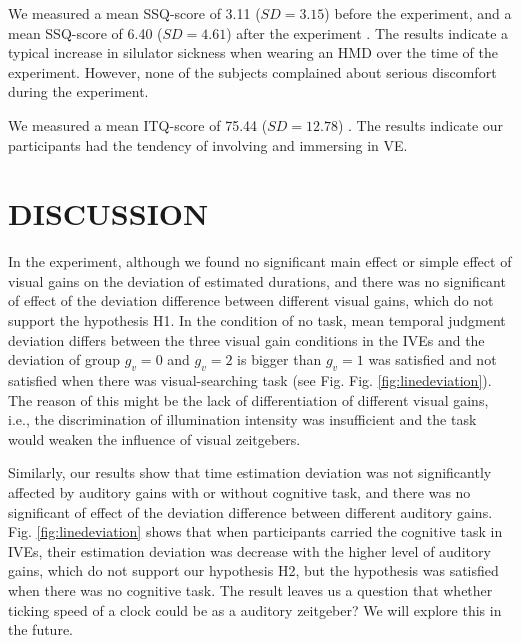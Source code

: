 \documentclass[sigconf]{acmart}
\begin{document}
We measured a mean SSQ-score of 3.11 ($SD = 3.15$) before the experiment, and a mean SSQ-score of 6.40 ($SD = 4.61$) after the experiment \cite{kennedy1993simulator}. The results indicate a typical increase in silulator sickness when wearing an HMD over the time of the experiment. However, none of the subjects complained about serious discomfort during the experiment.

We measured a mean ITQ-score of 75.44 ($SD = 12.78$) \cite{witmer1998measuring}. The results indicate our participants had the tendency of involving and immersing in VE.

\section{DISCUSSION}

In the experiment, although we found no significant main effect or simple effect of visual gains on the deviation of estimated durations, and there was no significant of effect of the deviation difference between different visual gains, which do not support the hypothesis H1. In the condition of no task, mean temporal judgment deviation differs between the three visual gain conditions in the IVEs and the deviation of group $g_v = 0$ and $g_v = 2$ is bigger than $g_v = 1$ was satisfied and not satisfied when there was visual-searching task (see Fig. Fig. \ref{fig:linedeviation}). The reason of this might be the lack of differentiation of different visual gains, i.e., the discrimination of illumination intensity was insufficient and the task would weaken the influence of visual zeitgebers.

Similarly, our results show that time estimation deviation was not significantly affected by auditory gains with or without cognitive task, and there was no significant of effect of the deviation difference between different auditory gains. Fig. \ref{fig:linedeviation} shows that when participants carried the cognitive task in IVEs, their estimation deviation was decrease with the higher level of auditory gains, which do not support our hypothesis H2, but the hypothesis was satisfied when there was no cognitive task. The result leaves us a question that whether ticking speed of a clock could be as a auditory zeitgeber? We will explore this in the future.

\end{document}
